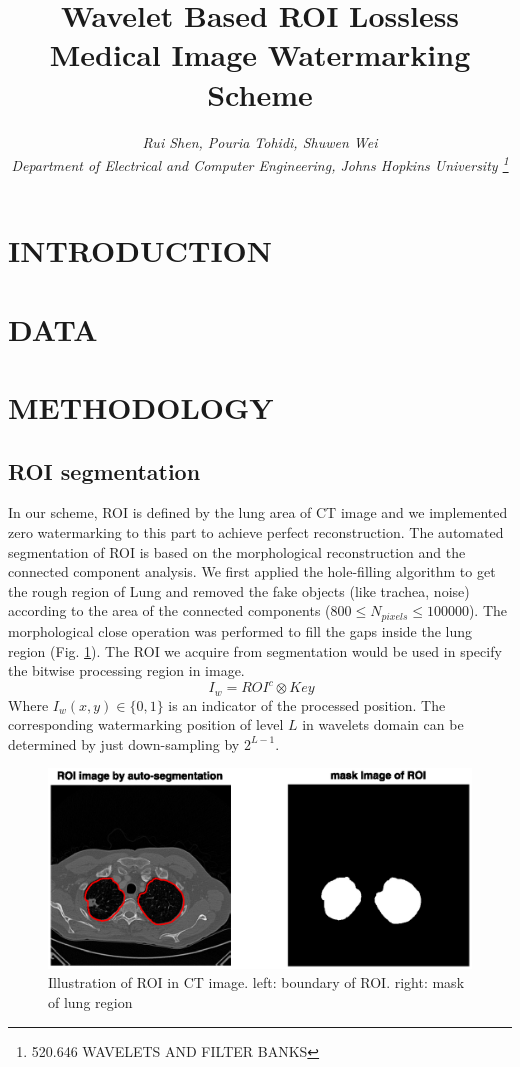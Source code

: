 \documentclass[letterpaper, 10 pt, conference]{ieeeconf}  %
\title{\LARGE \bf {Wavelet Based ROI Lossless Medical Image Watermarking Scheme}}
\author{\it Rui Shen, Pouria Tohidi, Shuwen Wei  \\ %
\normalsize {Department of Electrical and Computer Engineering, Johns Hopkins University}
\thanks{520.646 WAVELETS AND FILTER BANKS}}
\begin{document}
\maketitle
\thispagestyle{empty}
\pagestyle{empty}


\begin{abstract}


\end{abstract}


\section{INTRODUCTION}


\section{DATA}


\section{METHODOLOGY}
\subsection{ROI segmentation}
In our scheme, ROI is defined by the lung area of CT image and we implemented zero watermarking to this part to achieve perfect reconstruction. The automated segmentation of ROI is based on the morphological reconstruction and the connected component analysis. We first applied the hole-filling algorithm to get the rough region of Lung and removed the fake objects (like trachea, noise) according to the area of the connected components ($800 \leq N_{pixels} \leq100000$). The morphological close operation was performed to fill the gaps inside the lung region (Fig. \ref{ROI}). The ROI we acquire from segmentation would be used in specify the bitwise processing region in image.
\[\ I_w = ROI^c \otimes Key\]
Where $I_w(x,y)\in\{0,1\}$ is an indicator of  the processed position. The corresponding watermarking position of level $L$ in wavelets domain can be determined by just down-sampling by $2^{L-1}$.
\begin{figure}[htbp]
	\centering
	\includegraphics[width=1\linewidth]{ROI}
	\caption{Illustration of ROI in CT image. left: boundary of ROI. right: mask of lung region}
	\label{ROI}
\end{figure}
\end{document}
